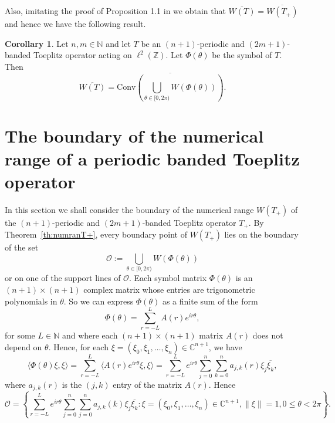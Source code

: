 \documentclass[12pt,reqno]{amsart}
\theoremstyle{definition}
\newtheorem{corollary}[theorem]{Corollary}
\newcommand{\ovl}[1]{\overline{#1}}	%
\newcommand{\parn}[1]{\left( #1 \right)}%
\newcommand{\conv}[1]{\mathrm{Conv}\parn{#1}}	%
\newcommand{\Z}{{\mathbb{Z}}}
\newcommand{\C}{{\mathbb{C}}}
\newcommand{\N}{{\mathbb{N}}}
\begin{document}
Also, imitating the proof of Proposition 1.1 in \cite{IM} we obtain that $\ovl{W(T)}=\ovl{W(T_+)}$ and hence we have the following result.

\begin{corollary}
Let $n, m \in \N$ and let $T$ be an $(n+1)$-periodic and $(2m+1)$-banded Toeplitz operator acting on $\ell^2 (\Z)$. Let $\Phi(\theta)$ be the symbol of $T$. Then 
\[
   \overline{W(T)} =\ovl{ \conv{ \bigcup_{\theta \in [0, 2\pi)} W(\Phi(\theta))}}.
   \]
\end{corollary}

\section{The boundary of the numerical range of a periodic banded Toeplitz operator}

In this section we shall consider the boundary of the numerical range $W(T_+)$ of the $(n+1)$-periodic and $(2m+1)$-banded Toeplitz operator $T_+$. By Theorem~\ref{th:numranT+}, every boundary point of $W(T_+)$ lies on the boundary of the set 
\[
{\mathcal O}:=\bigcup_{\theta \in [0, 2 \pi)} W(\Phi(\theta))
\]
or on one of the support lines of $\mathcal O$. Each symbol matrix $\Phi(\theta)$ is an $(n+1) \times (n+1)$  complex matrix whose entries are trigonometric polynomials in  $\theta$. So we can express $\Phi(\theta)$ as a finite sum of the form
    \[
    \Phi(\theta)= \sum_{r=-L}^L A(r) e^{i r \theta},
    \]
    for some $L \in \N$ and
    where each $(n+1)\times(n+1)$ matrix $A(r)$ does not depend on $\theta$. Hence, for each $\xi=(\xi_0, \xi_1, \dots, \xi_n) \in \C^{n+1}$, we have
    \[
    \langle \Phi(\theta) \xi, \xi \rangle =\sum_{r=-L}^{L} \langle A(r) e^{i r \theta} \xi, \xi \rangle = \sum_{r=-L}^{L} e^{i r \theta} \sum_{j=0}^n \sum_{k=0}^n a_{j,k}(r) \xi_j \ovl{\xi_k}, 
    \]
    where $a_{j,k}(r)$ is the $(j,k)$ entry of the matrix $A(r)$. Hence
\[
{\mathcal O}=\left\{ \sum_{r=-L}^L e^{i r \theta} \sum_{j=0}^{n} \sum_{j=0}^{n}  a_{j,k}(k) \xi_{j} \overline{\xi_k} :
    \xi=(\xi_0, \xi_1, \dots, \xi_{n}) \in {\mathbb C}^{n+1}, \| \xi \| =1,  0 \leq \theta < 2\pi \right\}.
    \]
    
\end{document}
